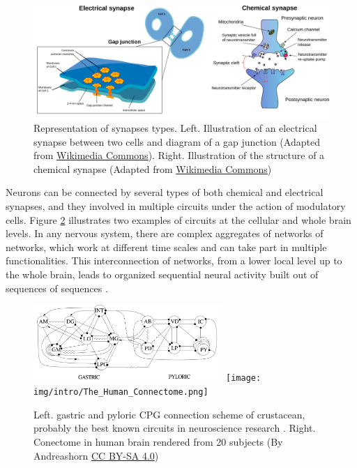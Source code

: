 \begin{figure}[hbt!]
    \centering
    \includegraphics[width=\linewidth]{img/intro/synapses.pdf}
    \caption{Representation of synapses types. Left. Illustration of an electrical synapse between two cells and diagram of a gap junction (Adapted from \href{https://commons.wikimedia.org/wiki/File:Gap_cell_junction-en.svg}{Wikimedia Commons}). Right. Illustration of the structure of a chemical synapse (Adapted from \href{https://commons.wikimedia.org/wiki/File:Synapse_diag1.svg}{Wikimedia Commons})}
    \label{fig:synapse-types}
\end{figure}

Neurons can be connected by several types of both chemical and electrical synapses, and they involved in multiple circuits under the action of modulatory cells. Figure \ref{fig:neural circuits} illustrates two examples of circuits at the cellular and whole brain levels. In any nervous system, there are complex aggregates of networks of networks, which work at different time scales and can take part in multiple functionalities. This interconnection of networks, from a lower local level up to the whole brain, leads to organized sequential neural activity built out of sequences of sequences \parencite{rabinovich_sequential_2020}.


\begin{figure}[hbt!]
    \centering
    \includegraphics[width=0.64\textwidth]{img/intro/cpg diagram.png}
    \texttt{[image: img/intro/The\_Human\_Connectome.png]}
    \caption{Left. gastric and pyloric CPG connection scheme of crustacean, probably the best known circuits in neuroscience research \parencite{huerta_topology_2001}. Right. Conectome in human brain rendered from 20 subjects (By Andreashorn \href{https://commons.wikimedia.org/w/index.php?curid=41581320}{CC BY-SA 4.0})}
    \label{fig:neural circuits}
\end{figure}

